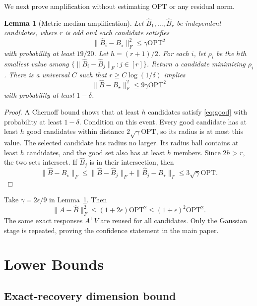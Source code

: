 \documentclass[twoside]{article}
\newtheorem{lemma}[theorem]{Lemma}
\newcommand{\OPT}{\mathrm{OPT}}
\begin{document}
We next prove amplification without estimating $\OPT$ or any residual norm.

\begin{lemma}[Metric median amplification]
\label{lem:median}
Let $\widehat B_1,\ldots,\widehat B_r$ be independent candidates, where $r$
is odd and each candidate satisfies
\begin{equation}
 \|\widehat B_i-B_\star\|_F^2\le\gamma\OPT^2
 \label{eq:good}
\end{equation}
with probability at least $19/20$. Let $h=(r+1)/2$. For each $i$, let
$\rho_i$ be the $h$th smallest value among
$\{\|\widehat B_i-\widehat B_j\|_F:j\in[r]\}$. Return a candidate minimizing
$\rho_i$. There is a universal $C$ such that $r\ge C\log(1/\delta)$ implies
\begin{equation}
 \|\widehat B-B_\star\|_F^2\le9\gamma\OPT^2
 \label{eq:median-conclusion}
\end{equation}
with probability at least $1-\delta$.
\end{lemma}

\begin{proof}
A Chernoff bound shows that at least $h$ candidates satisfy \eqref{eq:good}
with probability at least $1-\delta$. Condition on this event. Every good
candidate has at least $h$ good candidates within distance
$2\sqrt\gamma\OPT$, so its radius is at most this value. The selected
candidate has radius no larger. Its radius ball contains at least $h$
candidates, and the good set also has at least $h$ members. Since $2h>r$,
the two sets intersect. If $\widehat B_j$ is in their intersection, then
\[
 \|\widehat B-B_\star\|_F
 \le\|\widehat B-\widehat B_j\|_F
 +\|\widehat B_j-B_\star\|_F
 \le3\sqrt\gamma\OPT.
\]
\end{proof}

Take $\gamma=2\epsilon/9$ in Lemma~\ref{lem:median}. Then
\[
 \|A-\widehat B\|_F^2
 \le(1+2\epsilon)\OPT^2
 \le(1+\epsilon)^2\OPT^2.
\]
The same exact responses $A^\top V$ are reused for all candidates. Only the
Gaussian stage is repeated, proving the confidence statement in the main
paper.

\section{Lower Bounds}
\label{app:lower}

\subsection{Exact-recovery dimension bound}
\end{document}
